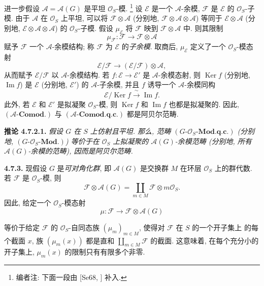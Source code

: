 进一步假设 \(\mathscr A=\mathscr A(G)\) 是平坦 \(\mathcal O_S\)-模.
\footnote{编者注: 下面一段由 [Se68,
] 补入.}
设 \(\mathscr E\) 是一个 \(\mathscr A\)-余模, \(\mathscr F\) 是
\(\mathscr E\) 的 \(\mathcal O_S\)-子模. 由于 \(\mathscr A\)
在 \(\mathcal O_S\) 上平坦, 可以将 \(\mathscr F\otimes\mathscr A\)
(分别地, \(\mathscr F\otimes\mathscr A\otimes\mathscr A\))
等同于 \(\mathscr E\otimes\mathscr A\)
(分别地, \(\mathscr E\otimes\mathscr A\otimes\mathscr A\)) 的
\(\mathcal O_S\)-子模. 假设 \(\mu_{\mathscr E}\) 将
\(\mathscr F\) 映到 \(\mathscr F\otimes\mathscr A\) 中.
则其限制
\[
  \mu_{\mathscr F}:\mathscr F\longrightarrow
    \mathscr F\otimes\mathscr A
\]
赋予 \(\mathscr F\) 一个 \(\mathscr A\)-余模结构; 称
\(\mathscr F\) 为 \(\mathscr E\) 的\emph{子余模}.
取商后, \(\mu_{\mathscr E}\) 定义了一个 \(\mathcal O_S\)-模态射
\[
  \mathscr E/\mathscr F\longrightarrow
  (\mathscr E/\mathscr F)\otimes\mathscr A,
\]
从而赋予 \(\mathscr E/\mathscr F\) 以 \(\mathscr A\)-余模结构.
若 \(f:\mathscr E\to\mathscr E'\) 是 \(\mathscr A\)-余模态射,
则 \(\operatorname{Ker}f\) (分别地, \(\operatorname{Im}f\)) 是
\(\mathscr E\) (分别地, \(\mathscr E'\)) 的 \(\mathscr A\)-子余模,
并且 \(f\) 诱导一个 \(\mathscr A\)-余模同构
\[
  \mathscr E/\operatorname{Ker}f
    \xrightarrow{\ \sim\ }
  \operatorname{Im}f.
\]
此外, 若 \(\mathscr E\) 和 \(\mathscr E'\) 是拟凝聚
\(\mathcal O_S\)-模, 则 \(\operatorname{Ker}f\) 和
\(\operatorname{Im}f\) 也都是拟凝聚的. 因此,
\((\mathscr A\text{-}\mathbf{Comod.})\) 与
\((\mathscr A\text{-}\mathbf{Comod.q.c.})\) 都是阿贝尔范畴.

\medskip
\noindent{}\textbf{推论 4.7.2.1.}
\textit{假设 \(G\) 在 \(S\) 上仿射且平坦. 那么, 范畴
\((G\text{-}\mathcal O_S\text{-}\mathbf{Mod.q.c.})\)
(分别地, \((G\text{-}\mathcal O_S\text{-}\mathbf{Mod.})\))
等价于在 \(\mathcal O_S\) 上拟凝聚的 \(\mathscr A(G)\)-余模范畴
(分别地, 所有 \(\mathscr A(G)\)-余模的范畴), 因而是阿贝尔范畴.}

\medskip
\noindent{}\textbf{4.7.3.}
现假设 \(G\) 是\emph{可对角化群}, 即 \(\mathscr A(G)\)
是交换群 \(M\) 在环层 \(\mathcal O_S\) 上的群代数.
若 \(\mathscr F\) 是 \(\mathcal O_S\)-模, 则
\[
  \mathscr F\otimes\mathscr A(G)
    =\coprod_{m\in M}\mathscr F\otimes m\mathcal O_S.
\]
因此, 给定一个 \(\mathcal O_S\)-模态射
\[
  \mu:\mathscr F\longrightarrow\mathscr F\otimes\mathscr A(G)
\]

等价于给定 \(\mathscr F\) 的 \(\mathcal O_S\)-自同态族
\((\mu_m)_{m\in M}\), 使得对 \(\mathscr F\) 在 \(S\) 的一个开子集上
的每个截面 \(x\), 族 \((\mu_m(x))\) 都是直和
\(\coprod_{m\in M}\mathscr F\) 的截面. 这意味着, 在每个充分小的
开子集上, \(\mu_m(x)\) 的限制只有有限多个非零.

